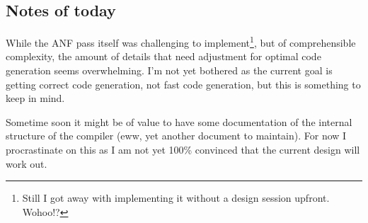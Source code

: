 \documentclass[12pt, article]{article}
\begin{document}
\subsection{Notes of today}

While the ANF pass itself was challenging to implement\footnote{Still
  I got away with implementing it without a design session
  upfront. Wohoo!?}, but of comprehensible complexity, the amount of
details that need adjustment for optimal code generation seems
overwhelming.
I'm not yet bothered as the current goal is getting correct code
generation, not fast code generation, but this is something to keep in
mind.


Sometime soon it might be of value to have some documentation of the
internal structure of the compiler (eww, yet another document to
maintain).
For now I procrastinate on this as I am not yet 100\% convinced that
the current design will work out.
\end{document}
